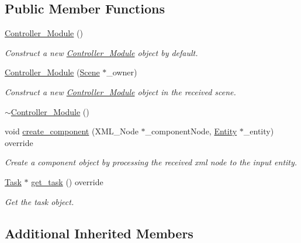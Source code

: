 \subsection*{Public Member Functions}
\begin{DoxyCompactItemize}
\item 
\mbox{\hyperlink{classbanita_1_1_controller___module_a0da114014e41487299db20b99ec15ebe}{Controller\+\_\+\+Module}} ()
\begin{DoxyCompactList}\small\item\em Construct a new \mbox{\hyperlink{classbanita_1_1_controller___module}{Controller\+\_\+\+Module}} object by default. \end{DoxyCompactList}\item 
\mbox{\hyperlink{classbanita_1_1_controller___module_acb21ceec082c7ebd025bedaab1cc7c8e}{Controller\+\_\+\+Module}} (\mbox{\hyperlink{classbanita_1_1_scene}{Scene}} $\ast$\+\_\+owner)
\begin{DoxyCompactList}\small\item\em Construct a new \mbox{\hyperlink{classbanita_1_1_controller___module}{Controller\+\_\+\+Module}} object in the received scene. \end{DoxyCompactList}\item 
\mbox{\hyperlink{classbanita_1_1_controller___module_a0873f454232ce84496bd55fca940c4d4}{$\sim$\+Controller\+\_\+\+Module}} ()
\item 
void \mbox{\hyperlink{classbanita_1_1_controller___module_a5176cb9d457c9bd69d6db37b18a79f13}{create\+\_\+component}} (X\+M\+L\+\_\+\+Node $\ast$\+\_\+component\+Node, \mbox{\hyperlink{classbanita_1_1_entity}{Entity}} $\ast$\+\_\+entity) override
\begin{DoxyCompactList}\small\item\em Create a component object by processing the received xml node to the input entity. \end{DoxyCompactList}\item 
\mbox{\hyperlink{classbanita_1_1_task}{Task}} $\ast$ \mbox{\hyperlink{classbanita_1_1_controller___module_a8868454d67a5f949b401c9cfc0a12eba}{get\+\_\+task}} () override
\begin{DoxyCompactList}\small\item\em Get the task object. \end{DoxyCompactList}\end{DoxyCompactItemize}
\subsection*{Additional Inherited Members}


